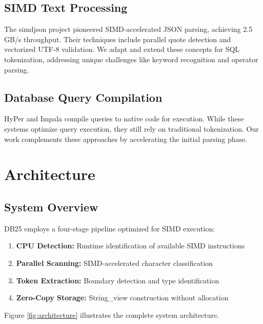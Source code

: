 \documentclass[conference]{IEEEtran}
\begin{document}
\subsection{SIMD Text Processing}

The simdjson project \cite{langdale2019} pioneered SIMD-accelerated JSON parsing, achieving 2.5 GB/s throughput. Their techniques include parallel quote detection and vectorized UTF-8 validation. We adapt and extend these concepts for SQL tokenization, addressing unique challenges like keyword recognition and operator parsing.

\subsection{Database Query Compilation}

HyPer \cite{neumann2011} and Impala \cite{wanderman2014} compile queries to native code for execution. While these systems optimize query execution, they still rely on traditional tokenization. Our work complements these approaches by accelerating the initial parsing phase.

\section{Architecture}

\subsection{System Overview}

DB25 employs a four-stage pipeline optimized for SIMD execution:

\begin{enumerate}
\item \textbf{CPU Detection:} Runtime identification of available SIMD instructions
\item \textbf{Parallel Scanning:} SIMD-accelerated character classification
\item \textbf{Token Extraction:} Boundary detection and type identification
\item \textbf{Zero-Copy Storage:} String\_view construction without allocation
\end{enumerate}

Figure \ref{fig:architecture} illustrates the complete system architecture.
\end{document}

